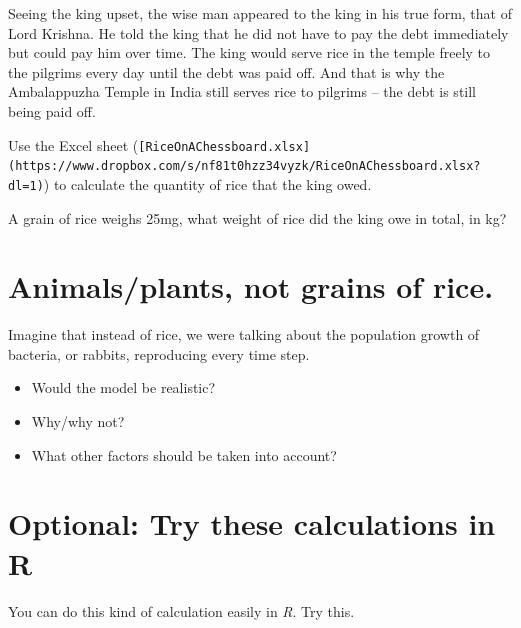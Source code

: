 \documentclass[
  a4paper]{book}
\newenvironment{Shaded}{\begin{snugshade}}{\end{snugshade}}
\newcommand{\AttributeTok}[1]{\textcolor[rgb]{0.13,0.29,0.53}{#1}}
\newcommand{\ConstantTok}[1]{\textcolor[rgb]{0.56,0.35,0.01}{#1}}
\newcommand{\ControlFlowTok}[1]{\textcolor[rgb]{0.13,0.29,0.53}{\textbf{#1}}}
\newcommand{\DecValTok}[1]{\textcolor[rgb]{0.00,0.00,0.81}{#1}}
\newcommand{\FunctionTok}[1]{\textcolor[rgb]{0.13,0.29,0.53}{\textbf{#1}}}
\newcommand{\NormalTok}[1]{#1}
\newcommand{\OtherTok}[1]{\textcolor[rgb]{0.56,0.35,0.01}{#1}}
\newcommand{\SpecialCharTok}[1]{\textcolor[rgb]{0.81,0.36,0.00}{\textbf{#1}}}
\providecommand{\tightlist}{%
  \setlength{\itemsep}{0pt}\setlength{\parskip}{0pt}}
\begin{document}
Seeing the king upset, the wise man appeared to the king in his true form, that of Lord Krishna. He told the king that he did not have to pay the debt immediately but could pay him over time. The king would serve rice in the temple freely to the pilgrims every day until the debt was paid off. And that is why the Ambalappuzha Temple in India still serves rice to pilgrims -- the debt is still being paid off.

\begin{do-something}
Use the Excel sheet
(\texttt{{[}RiceOnAChessboard.xlsx{]}(https://www.dropbox.com/s/nf81t0hzz34vyzk/RiceOnAChessboard.xlsx?dl=1)})
to calculate the quantity of rice that the king owed.

A grain of rice weighs 25mg, what weight of rice did the king owe in
total, in kg?
\end{do-something}

\section{Animals/plants, not grains of rice.}\label{animalsplants-not-grains-of-rice.}

Imagine that instead of rice, we were talking about the population growth of bacteria, or rabbits, reproducing every time step.

\begin{itemize}
\tightlist
\item
  Would the model be realistic?
\item
  Why/why not?
\item
  What other factors should be taken into account?
\end{itemize}

\section{Optional: Try these calculations in R}\label{optional-try-these-calculations-in-r}

You can do this kind of calculation easily in \emph{R}. Try this.

\begin{Shaded}
\end{Shaded}
\end{document}
